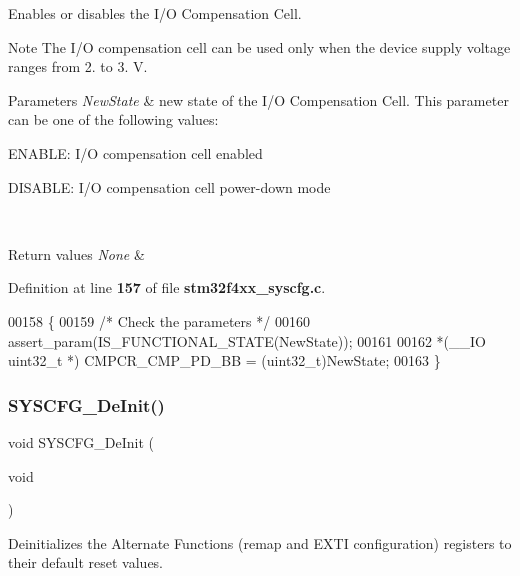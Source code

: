 Enables or disables the I/O Compensation Cell. 

\begin{DoxyNote}{Note}
The I/O compensation cell can be used only when the device supply voltage ranges from 2. to 3. V. 
\end{DoxyNote}

\begin{DoxyParams}{Parameters}
{\em New\+State} & new state of the I/O Compensation Cell. This parameter can be one of the following values\+: \begin{DoxyItemize}
\item E\+N\+A\+B\+LE\+: I/O compensation cell enabled \item D\+I\+S\+A\+B\+LE\+: I/O compensation cell power-\/down mode \end{DoxyItemize}
\\
\hline
\end{DoxyParams}

\begin{DoxyRetVals}{Return values}
{\em None} & \\
\hline
\end{DoxyRetVals}


Definition at line \textbf{ 157} of file \textbf{ stm32f4xx\+\_\+syscfg.\+c}.


\begin{DoxyCode}
00158 \{
00159   \textcolor{comment}{/* Check the parameters */}
00160   assert_param(IS_FUNCTIONAL_STATE(NewState));
00161 
00162   *(\_\_IO uint32\_t *) CMPCR_CMP_PD_BB = (uint32\_t)NewState;
00163 \}
\end{DoxyCode}
\mbox{\label{group__SYSCFG_gaf2f9faa2df9a59a68ae17fae23bc478e}} 
\subsubsection{S\+Y\+S\+C\+F\+G\+\_\+\+De\+Init()}
{\footnotesize\ttfamily void S\+Y\+S\+C\+F\+G\+\_\+\+De\+Init (\begin{DoxyParamCaption}\item[{void}]{ }\end{DoxyParamCaption})}



Deinitializes the Alternate Functions (remap and E\+X\+TI configuration) registers to their default reset values. 


